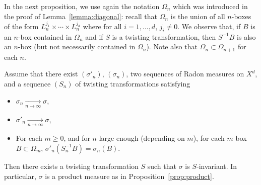 \documentclass[10pt]{amsart}
\theoremstyle{definition}\newtheorem{defi}[theo]{Definition}\newtheorem{rema}[theo]{Remark}\newtheorem{exam}[theo]{Example}\newtheorem{exem}[theo]{Example}\newtheorem{nota}[theo]{Notation}
\newcommand{\tend}[3][]{\xrightarrow[#2\to#3]{#1}}
\newcommand{\ovC}{\Omega}
\begin{document}
In the next proposition, we use again the notation $\ovC_n$ which was introduced in the proof of Lemma~\ref{lemma:diagonal}: recall that $\ovC_n$ is the union of all $n$-boxes of the form $L_n^{j_1}\times\cdots\times L_n^{j_d}$ where for all $i=1,\ldots,d$, $j_i\neq0$. We observe that, if $B$ is an $n$-box contained in $\ovC_n$ and if $S$ is a twisting transformation, then $S^{-1}B$ is also an $n$-box (but not necessarily contained in $\ovC_n$). Note also that $\ovC_n\subset \ovC_{n+1}$ for each $n$.

\begin{prop}\label{prop:twist}
Assume that there exist $(\sigma'_n)$, $(\sigma_n)$, two sequences of Radon measures on $X^d$, and a sequence $(S_n)$ of twisting transformations satisfying
\begin{itemize}
\item $\sigma_n \tend{n}{\infty} \sigma$,
\item $\sigma'_n \tend{n}{\infty} \sigma$,
\item For each $m\ge0$, and for $n$ large enough (depending on $m$), for each $m$-box $B\subset\ovC_m$, $\sigma'_n(S_n^{-1}B)=\sigma_n(B)$.
\end{itemize}
Then there exists a twisting transformation $S$ such that $\sigma$ is $S$-invariant. In particular, $\sigma$ is a product measure as in Proposition~\ref{prop:product}.
\end{prop}
\end{document}
